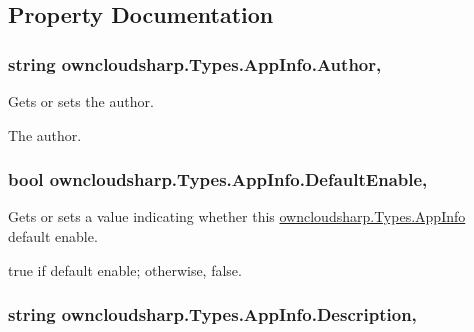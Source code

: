 \subsection{Property Documentation}
\hypertarget{classowncloudsharp_1_1_types_1_1_app_info_a479f84fd808ac1189895a7168d09aae2}{}
\subsubsection[{Author}]{\setlength{\rightskip}{0pt plus 5cm}string owncloudsharp.\+Types.\+App\+Info.\+Author\hspace{0.3cm}{\ttfamily [get]}, {\ttfamily [set]}}\label{classowncloudsharp_1_1_types_1_1_app_info_a479f84fd808ac1189895a7168d09aae2}


Gets or sets the author. 

The author.\hypertarget{classowncloudsharp_1_1_types_1_1_app_info_a21fbeb14bcd6b6783ef68231f9230f42}{}
\subsubsection[{Default\+Enable}]{\setlength{\rightskip}{0pt plus 5cm}bool owncloudsharp.\+Types.\+App\+Info.\+Default\+Enable\hspace{0.3cm}{\ttfamily [get]}, {\ttfamily [set]}}\label{classowncloudsharp_1_1_types_1_1_app_info_a21fbeb14bcd6b6783ef68231f9230f42}


Gets or sets a value indicating whether this \hyperlink{classowncloudsharp_1_1_types_1_1_app_info}{owncloudsharp.\+Types.\+App\+Info} default enable. 

{\ttfamily true} if default enable; otherwise, {\ttfamily false}.\hypertarget{classowncloudsharp_1_1_types_1_1_app_info_a3fe8c924b76d206ea155ff7df8afa08b}{}
\subsubsection[{Description}]{\setlength{\rightskip}{0pt plus 5cm}string owncloudsharp.\+Types.\+App\+Info.\+Description\hspace{0.3cm}{\ttfamily [get]}, {\ttfamily [set]}}\label{classowncloudsharp_1_1_types_1_1_app_info_a3fe8c924b76d206ea155ff7df8afa08b}


